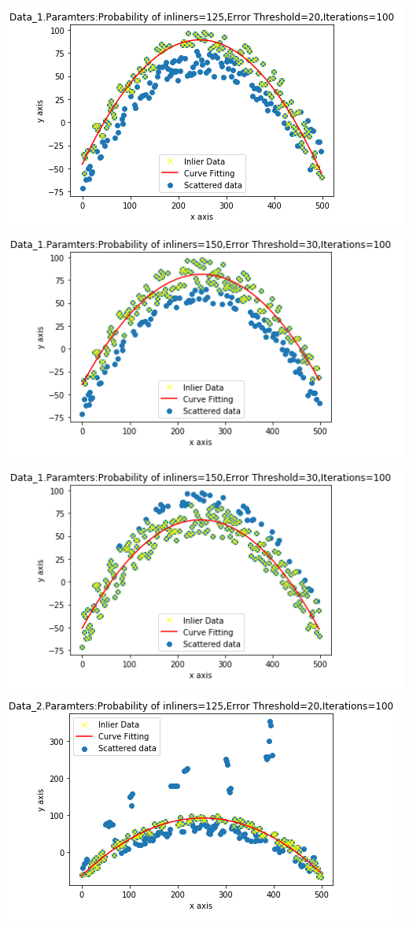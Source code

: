 \documentclass{article}
\begin{document}
\begin{center}
    \includegraphics{Data_1_Parameter_1.png}
    \includegraphics{Data_1_Parameter_2.PNG}
    \includegraphics{Data_1_Paramter_3.png}
    \includegraphics{Data_2_Parameter_1.PNG}

\end{center}
\end{document}
